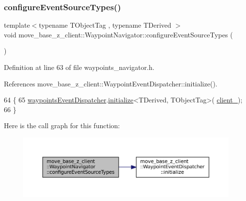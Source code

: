 \subsubsection{\texorpdfstring{configure\+Event\+Source\+Types()}{configureEventSourceTypes()}}
{\footnotesize\ttfamily template$<$typename T\+Object\+Tag , typename T\+Derived $>$ \\
void move\+\_\+base\+\_\+z\+\_\+client\+::\+Waypoint\+Navigator\+::configure\+Event\+Source\+Types (\begin{DoxyParamCaption}{ }\end{DoxyParamCaption})\hspace{0.3cm}{\ttfamily [inline]}}



Definition at line 63 of file waypoints\+\_\+navigator.\+h.



References move\+\_\+base\+\_\+z\+\_\+client\+::\+Waypoint\+Event\+Dispatcher\+::initialize().


\begin{DoxyCode}
64   \{
65     \hyperlink{classmove__base__z__client_1_1WaypointNavigator_a488a89db6cd20bc12548ac454254829f}{waypointsEventDispatcher}.\hyperlink{classmove__base__z__client_1_1WaypointEventDispatcher_a70fc3a92c59e40648f350f3912d736ae}{initialize}<TDerived, TObjectTag>(
      \hyperlink{classmove__base__z__client_1_1WaypointNavigator_aadb289ffdaeda3a751fe569a2ee84c48}{client\_});
66   \}
\end{DoxyCode}
Here is the call graph for this function\+:
\nopagebreak
\begin{figure}[H]
\begin{center}
\leavevmode
\includegraphics[width=350pt]{classmove__base__z__client_1_1WaypointNavigator_aafd4851a12699b1e92dd24e085bacb0e_cgraph}
\end{center}
\end{figure}
\mbox{\label{classmove__base__z__client_1_1WaypointNavigator_a5c221c2678cd93acbd0484308ca16b21}} 
